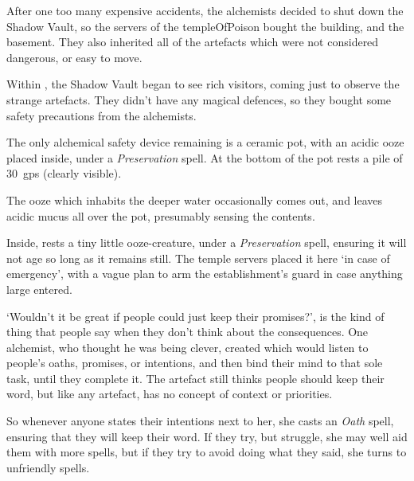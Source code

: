 \begin{multicols}{2}
\showStdSpells[
  \setcounter{diceNo}{0}
]


\begin{exampletext}
  After one too many expensive accidents, the alchemists decided to shut down the Shadow Vault, so the \glspl{server} of the \gls{templeOfPoison} bought the building, and the basement.
  They also inherited all of the \glspl{artefact} which were not considered dangerous, or easy to move.

  Within , the Shadow Vault began to see rich visitors, coming just to observe the strange \glspl{artefact}.
  They didn't have any magical defences, so they bought some safety precautions from the alchemists.
\end{exampletext}

The only alchemical safety device remaining is a ceramic pot, with an acidic ooze placed inside, under a \textit{Preservation} spell.
At the bottom of the pot rests a pile of 30~\glspl{gp} (clearly visible).

The ooze which inhabits the deeper water  occasionally comes out, and leaves acidic mucus all over the pot, presumably sensing the contents.

Inside, rests a tiny little ooze-creature, under a \textit{Preservation} spell, ensuring it will not age so long as it remains still.
The temple \glspl{server} placed it here `in case of emergency', with a vague plan to arm the establishment's guard in case anything large entered.

\jelly[1]


\begin{exampletext}
  `Wouldn't it be great if people could just keep their promises?', is the kind of thing that people say when they don't think about the consequences.
  One alchemist, who thought he was being clever, created  which would listen to people's oaths, promises, or intentions, and then bind their mind to that sole task, until they complete it.
  The \gls{artefact} still thinks people should keep their word, but like any \gls{artefact}, has no concept of context or priorities.

  So whenever anyone states their intentions next to her, she casts an \textit{Oath} spell, ensuring that they will keep their word.
  If they try, but struggle, she may well aid them with more spells, but if they try to avoid doing what they said, she turns to unfriendly spells.


\end{exampletext}
\end{multicols}
